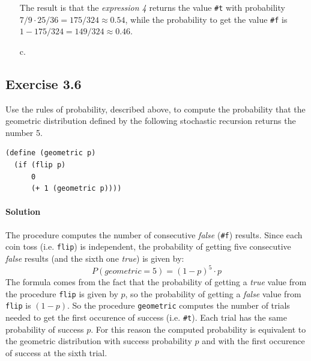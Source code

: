 \begin{itemize}
        The result is that the \textit{expression 4} returns the value \texttt{\#t} with probability $7/9 \cdot 25/36 = 175/324 
        \approx 0.54$, while the probability to get the value \texttt{\#f} is $ 1 - 175/324 = 149/324 \approx 0.46$.

    \item[c.]  
\end{itemize}

\subsection*{Exercise 3.6}
Use the rules of probability, described above, to compute the probability that the geometric distribution 
defined by the following stochastic recursion returns the number 5.

\begin{lstlisting}
(define (geometric p)
  (if (flip p)
      0
      (+ 1 (geometric p))))
\end{lstlisting}

\paragraph{Solution}
The procedure computes the number of consecutive \textit{false} (\texttt{\#f}) results. Since each coin toss (i.e. \texttt{flip}) is 
independent, the probability of getting five consecutive \textit{false} results (and the sixth one \textit{true}) is given by:
\[ P(geometric = 5) = (1 - p)^{5} \cdot p \]
The formula comes from the fact that the probability of getting a \textit{true} value from the procedure \texttt{flip} is given by
$p$, so the probability of getting a \textit{false} value from \texttt{flip} is $ (1 - p) $.
So the procedure \texttt{geometric} computes the number of trials needed to get the first occurence of success (i.e. \texttt{\#t}).
Each trial has the same probability of success $p$.
For this reason the computed probability is equivalent to the geometric distribution with success probability $p$ and with the 
first occurence of success at the sixth trial.


